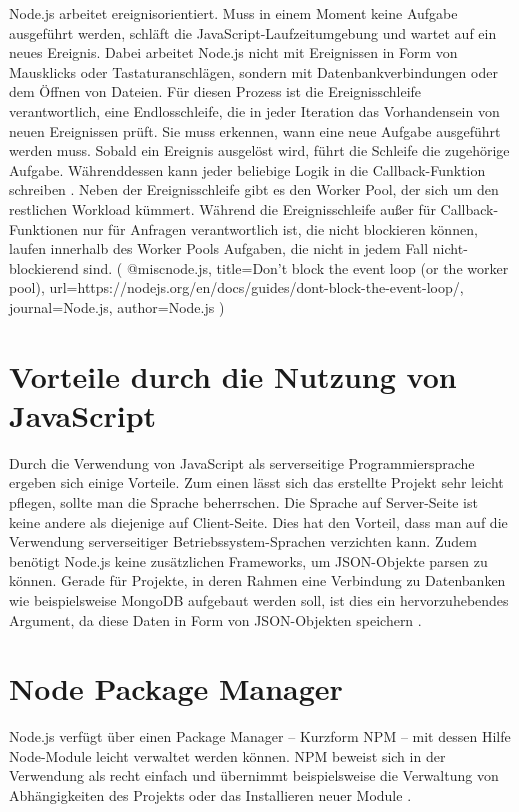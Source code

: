 Node.js arbeitet ereignisorientiert. Muss in einem Moment keine Aufgabe ausgeführt werden, schläft die JavaScript-Laufzeitumgebung und wartet auf ein neues Ereignis. Dabei arbeitet Node.js nicht mit Ereignissen in Form von Mausklicks oder Tastaturanschlägen, sondern mit Datenbankverbindungen oder dem Öffnen von Dateien. 
Für diesen Prozess ist die Ereignisschleife verantwortlich, eine Endlosschleife, die in jeder Iteration das Vorhandensein von neuen Ereignissen prüft. Sie muss erkennen, wann eine neue Aufgabe ausgeführt werden muss. Sobald ein Ereignis ausgelöst wird, führt die Schleife die zugehörige Aufgabe. Währenddessen kann jeder beliebige Logik in die Callback-Funktion schreiben \cite[S.3]{neins}.
Neben der Ereignisschleife gibt es den Worker Pool, der sich um den restlichen Workload kümmert. Während die Ereignisschleife außer für Callback-Funktionen nur für Anfragen verantwortlich ist, die nicht blockieren können, laufen innerhalb des Worker Pools Aufgaben, die nicht in jedem Fall nicht-blockierend sind. ( @misc{node.js, title={Don't block the event loop (or the worker pool)}, url={https://nodejs.org/en/docs/guides/dont-block-the-event-loop/}, journal={Node.js}, author={Node.js}} )

\section{Vorteile durch die Nutzung von JavaScript}

Durch die Verwendung von JavaScript als serverseitige Programmiersprache ergeben sich einige Vorteile. Zum einen lässt sich das erstellte Projekt sehr leicht pflegen, sollte man die Sprache beherrschen. Die Sprache auf Server-Seite ist keine andere als diejenige auf Client-Seite. Dies hat den Vorteil, dass man auf die Verwendung serverseitiger Betriebssystem-Sprachen verzichten kann.
Zudem benötigt Node.js keine zusätzlichen Frameworks, um JSON-Objekte parsen zu können. Gerade für Projekte, in deren Rahmen eine Verbindung zu Datenbanken wie beispielsweise MongoDB aufgebaut werden soll, ist dies ein hervorzuhebendes Argument, da diese Daten in Form von JSON-Objekten speichern \cite[S.3]{neins}. 

\section{Node Package Manager}
Node.js verfügt über einen Package Manager – Kurzform NPM – mit dessen Hilfe Node-Module leicht verwaltet werden können. NPM beweist sich in der Verwendung als recht einfach und übernimmt beispielsweise die Verwaltung von Abhängigkeiten des Projekts oder das Installieren neuer Module \cite[S.10]{neins}. 

